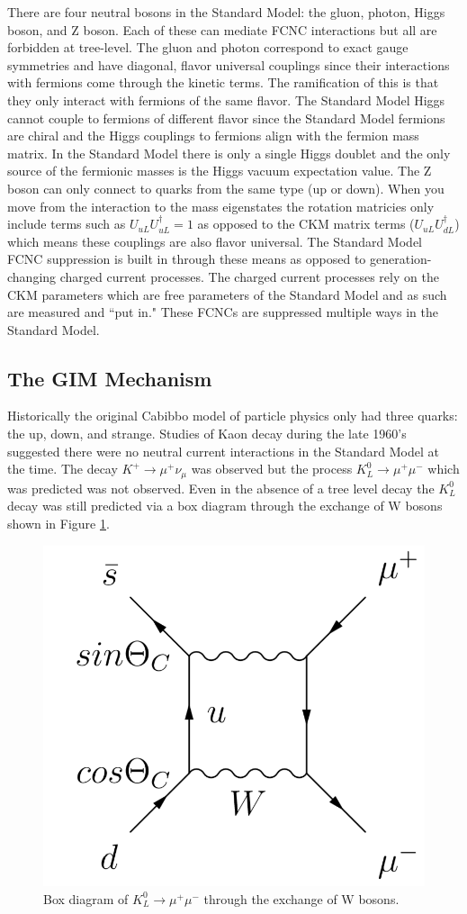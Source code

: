 There are four neutral bosons in the Standard Model: the gluon, photon, Higgs boson, and Z boson.  Each of these can mediate FCNC interactions but all are forbidden at tree-level.  The gluon and photon correspond to exact gauge symmetries and have diagonal, flavor universal couplings since their interactions with fermions come through the kinetic terms.  The ramification of this is that they only interact with fermions of the same flavor.  The Standard Model Higgs cannot couple to fermions of different flavor since the Standard Model fermions are chiral and the Higgs couplings to fermions align with the fermion mass matrix.  In the Standard Model there is only a single Higgs doublet and the only source of the fermionic masses is the Higgs vacuum expectation value.  The Z boson can only connect to quarks from the same type (up or down).  When you move from the interaction to the mass eigenstates the rotation matricies only include terms such as $U_{uL}U_{uL}^\dagger = 1$ as opposed to the CKM matrix terms ($U_{uL}U_{dL}^\dagger$) which means these couplings are also flavor universal. 
The Standard Model FCNC suppression is built in through these means as opposed to generation-changing charged current processes.  The charged current processes rely on the CKM parameters which are free parameters of the Standard Model and as such are measured and ``put in."  These FCNCs are suppressed multiple ways in the Standard Model.

\subsection{The GIM Mechanism}
Historically the original Cabibbo model of particle physics only had three quarks: the up, down, and strange.  Studies of Kaon decay during the late 1960's suggested there were no neutral current interactions in the Standard Model at the time.  The decay $K^+ \rightarrow \mu^+ \nu_\mu$ was observed but the process $K_L^0 \rightarrow \mu^+ \mu^- $ which was predicted was not observed.  Even in the absence of a tree level decay the $K_L^0$ decay was still predicted via a box diagram through the exchange of W bosons shown in Figure \ref{fig:KaonBox}.

\begin{figure}[h!]
	\centering
	\includegraphics[width=.4\columnwidth]{../ThesisImages/Theory/GIMDiagramsa.png}
	\caption{Box diagram of $K_L^0 \rightarrow \mu^+ \mu^-$ through the exchange of W bosons.}
	\label{fig:KaonBox}
\end{figure}

